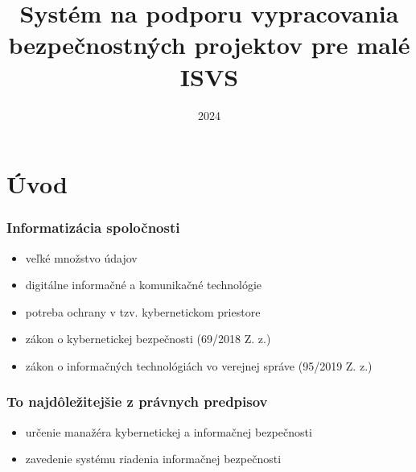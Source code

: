 \documentclass{beamer}
\title{Systém na podporu vypracovania bezpečnostných projektov pre malé ISVS}
\author{
    {Anton Kica} \\
    {\and} \\
    {\textit{Školiteľ}} \\
    {doc. RNDr. Daniel Olejár, PhD., mim. prof.}
}
\begin{document}
\section{Úvod}
\frame{\titlepage}
\date{2024}


\begin{frame}
  \frametitle{Informatizácia spoločnosti}

  \begin{itemize}
    \item veľké množstvo údajov
    \item digitálne informačné a komunikačné technológie
    \item potreba ochrany v tzv. kybernetickom priestore
    \item zákon o kybernetickej bezpečnosti (69/2018 Z. z.)
    \item zákon o informačných technológiách vo verejnej správe (95/2019 Z. z.)
  \end{itemize}

\end{frame}

\begin{frame}
  \frametitle{To najdôležitejšie z právnych predpisov}
  \begin{itemize}
    \item určenie manažéra kybernetickej a informačnej bezpečnosti
    \item zavedenie systému riadenia informačnej bezpečnosti
  \end{itemize}
\end{frame}

\end{document}
